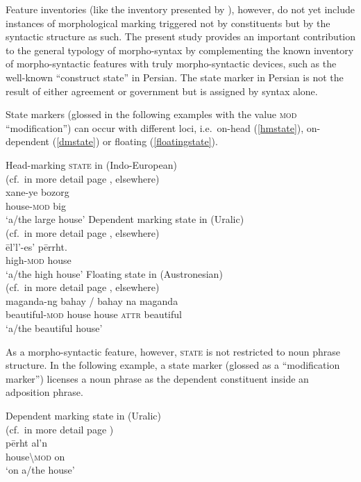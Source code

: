 Feature inventories (like the inventory presented by \citealt{kibort2010a}),  however, do not yet include instances of morphological marking triggered not by constituents but by the syntactic structure as such. The present study provides an important contribution to the general typology of morpho-syntax by complementing the known inventory of morpho-syntactic features with truly morpho-syntactic devices, such as the well-known “construct state” in Persian. The state marker in Persian is not the result of either agreement or government but is assigned by syntax alone.

State markers (glossed in the following examples with the value \textsc{mod} “modification”) can occur with different loci, i.e.~on-head (\ref{hmstate}), on-dependent (\ref{dmstate}) or floating (\ref{floatingstate}).
\begin{exe}
\ex
\begin{xlist}
\ex\label{hmstate} 
\rm{Head-marking \textsc{state} in  (Indo-European)}\\(cf.~in more detail page \pageref{persian constr state}, elsewhere)\\
\gll xane-ye bozorg\\
	house-\textsc{mod} big\\
\glt 	‘a/the large house’
\ex\label{dmstate}
\rm{Dependent marking state in  (Uralic)}\\(cf.~in more detail page \pageref{kildin attr.adj.sg}, elsewhere)\\
\gll 	ēl'l'-es' 		pērrht.\\
	high-\textsc{mod}	house\\
\glt	‘a/the high house’
\ex\label{floatingstate}
\rm{Floating state in  (Austronesian)}\\(cf.~in more detail page \pageref{tagalog linker}, elsewhere)\\
\gll maganda-ng bahay / bahay na maganda\\
	beautiful-\textsc{mod} house {} house \textsc{attr} beautiful\\
\glt	‘a/the beautiful house’
\end{xlist}
\end{exe}
As a morpho-syntactic feature, however, \textsc{state} is not restricted to noun phrase structure. In the following example, a state marker (glossed as a “modification marker”) licenses a noun phrase as the dependent constituent inside an adposition phrase.
\begin{exe}
\ex
\rm{Dependent marking state in  (Uralic)}\\(cf.~in more detail page \pageref{state ap kildin})\\
\gll 	pērht		al'n\\
	house\textbackslash\textsc{mod}	on\\
\glt 	‘on a/the house’
\end{exe}

